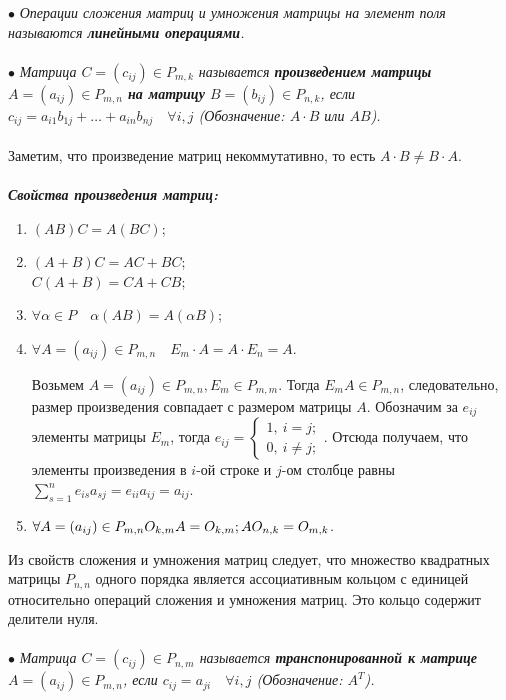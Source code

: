$\bullet$ \textit{Операции сложения матриц и умножения матрицы на элемент поля называются \textbf{линейными операциями}.}\\\\
$\bullet$ \textit{Матрица $C = (c_{ij}) \in P_{m,k}$ называется \textbf{произведением матрицы} $A = (a_{ij}) \in P_{m,n}$ \textbf{на матрицу} $B = (b_{ij}) \in P_{n,k}$, если $c_{ij} = a_{i1}b_{1j} + \ldots + a_{in}b_{nj}\quad \forall i,j$ (Обозначение: $A\cdot B$ или $AB$).}\\\\
Заметим, что произведение матриц некоммутативно, то есть $A\cdot B \ne B\cdot A$.\\\\
\textbf{\textit{Свойства произведения матриц:}}\begin{enumerate}
	\item $(AB)C = A(BC)$;
	\item $(A+B)C = AC + BC$;\\
	$C(A+B) = CA + CB$;
	\item $\forall \alpha \in P\quad \alpha(AB) = A(\alpha B)$;
	\item $\forall A = (a_{ij}) \in P_{m,n}\quad E_m\cdot A = A\cdot E_n = A.$
	\begin{Proof}
		Возьмем $A = (a_{ij}) \in P_{m,n}, E_m \in P_{m,m}$. Тогда $E_mA \in P_{m,n}$, следовательно, размер произведения совпадает с размером матрицы $A$. Обозначим за $e_{ij}$ элементы матрицы $E_m$, тогда $e_{ij} = \begin{cases}
			1,\ i=j;\\
			0,\ i\ne j;
		\end{cases}$. Отсюда получаем, что элементы произведения в $i$-ой строке и $j$-ом столбце равны $\sum_{s=1}^{n}e_{is}a_{sj} = e_{ii}a_{ij} = a_{ij}$.
	\end{Proof}
	\item $\forall A = (a_{ij}) \in P_{m,n}\\ O_{k,m}A = O_{k,m};\\ AO_{n,k} = O_{m,k}$.
\end{enumerate}
Из свойств сложения и умножения матриц следует, что множество квадратных матрицы $P_{n,n}$ одного порядка является ассоциативным кольцом с единицей относительно операций сложения и умножения матриц. Это кольцо содержит делители нуля.\\\\
$\bullet$ \textit{Матрица $C = (c_{ij})\in P_{n,m}$ называется \textbf{транспонированной к матрице} $A = (a_{ij})\in P_{m,n}$, если $c_{ij} = a_{ji}\quad \forall i,j$ (Обозначение: $A^T$).}\\\\
